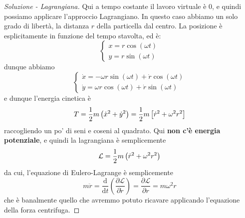 \documentclass[11pt]{scrartcl}
\newcommand{\dif}{\text{d}}
\begin{document}
	\begin{sol}
		\begin{proof}[Soluzione - Lagrangiana]
			Qui a tempo costante il lavoro virtuale è $0$, e quindi possiamo applicare l'approccio Lagrangiano.
			In questo caso abbiamo un solo grado di libertà, la distanza $r$ della particella dal centro. La posizione è esplicitamente in funzione del tempo stavolta, ed è:
			$$
			\begin{cases}
				x=r\cos(\omega t) \\
				y=r\sin (\omega t)
			\end{cases}
			$$
			dunque abbiamo
			$$
			\begin{cases}
				\dot{x}= -\omega r \sin(\omega t)+\dot{r}\cos(\omega t) \\
				\dot{y}= \omega r \cos(\omega t)+\dot{r}\sin(\omega t)
			\end{cases}
			$$
			e dunque l'energia cinetica è
			$$T=\frac{1}{2} m \left(\dot{x}^2+\dot{y}^2\right)=\frac{1}{2} m\left[\dot{r}^2+\omega^2r^2\right]$$
			raccogliendo un po' di seni e coseni al quadrato. Qui \textbf{non c'è energia potenziale}, e quindi la lagrangiana è semplicemente
			$$\mathcal{L}=\frac{1}{2} m \left(\dot{r}^2+\omega^2r^2\right)$$
			da cui, l'equazione di Eulero-Lagrange è semplicemente
			$$m\ddot{r}=\frac{\dif}{\dif t}\left(\frac{\partial \mathcal{L}}{\partial \dot{r}}\right)=\frac{\partial \mathcal{L}}{\partial r}=m\omega^2r$$
			che è banalmente quello che avremmo potuto ricavare applicando l'equazione della forza centrifuga.
		\end{proof}
	\end{sol}
\end{document}
